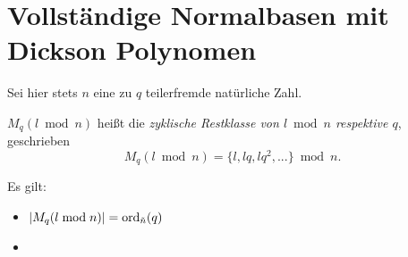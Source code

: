 \chapter{Vollständige Normalbasen mit Dickson Polynomen}

Sei hier stets $n$ eine zu $q$ teilerfremde natürliche Zahl.

\begin{notation}
  $M_q(l\bmod n)$ heißt die \emph{zyklische Restklasse von $l\bmod n$ respektive
  $q$}, geschrieben
  \[ M_q(l\bmod n) = \{l,lq,lq^2,...\} \bmod n.\]
\end{notation}


\begin{lemma}
  Es gilt:
  \begin{itemize}
    \item $| M_q(l\bmod n)| = \operatorname{ord}_{\tilde n}(q)$
    \item 
  \end{itemize}
\end{lemma}

